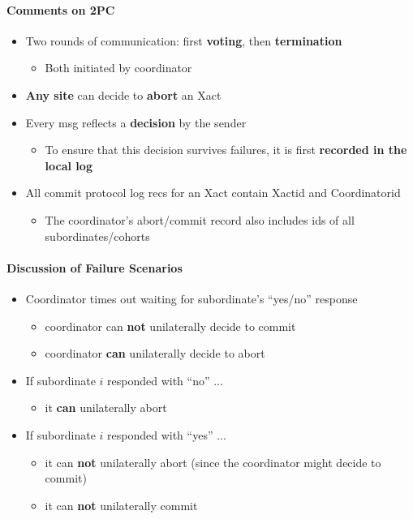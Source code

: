 \paragraph{Comments on 2PC}
\begin{itemize}
\item Two rounds of communication: first \textbf{voting},
  then \textbf{termination}
  \begin{itemize}
  \item Both initiated by coordinator
  \end{itemize}

\item \textbf{Any site} can decide to \textbf{abort} an Xact

\item Every msg reflects a \textbf{decision} by the sender
  \begin{itemize}
  \item To ensure that this decision survives failures, it is first
    \textbf{recorded in the local log}
  \end{itemize}

\item All commit protocol log recs for an Xact contain Xactid and
  Coordinatorid
  \begin{itemize}
  \item The coordinator's abort/commit record also includes
    ids of all subordinates/cohorts
  \end{itemize}
\end{itemize}

\paragraph{Discussion of Failure Scenarios}
\begin{itemize}
\item Coordinator times out waiting for subordinate's ``yes/no''
  response
  \begin{itemize}
  \item coordinator can \textbf{not} unilaterally decide to commit
  \item coordinator \textbf{can} unilaterally decide to abort
  \end{itemize}

\item If subordinate $i$ responded with ``no'' ...
  \begin{itemize}
  \item it \textbf{can} unilaterally abort
  \end{itemize}

\item If subordinate $i$ responded with ``yes'' ...
  \begin{itemize}
  \item it can \textbf{not} unilaterally abort
    (since the coordinator might decide to commit)
  \item it can \textbf{not} unilaterally commit
  \end{itemize}
\end{itemize}


